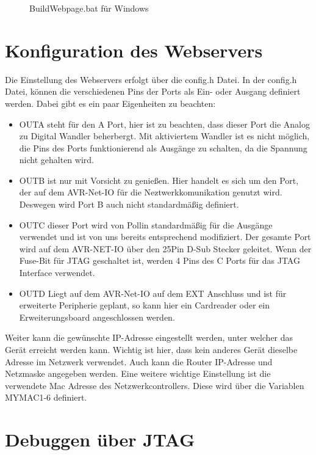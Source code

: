 \begin{figure}[H]

\caption{BuildWebpage.bat für Windows}
\label{output}
\end{figure}

\section{Konfiguration des Webservers}

Die Einstellung des Webservers erfolgt über die \textrm{config.h} Datei. In der
\textrm{config.h} Datei, können die verschiedenen Pins der Ports als Ein- oder
Ausgang definiert werden. Dabei gibt es ein paar Eigenheiten zu beachten:
\begin{itemize}
  \item OUTA steht für den A Port, hier ist zu beachten, dass dieser Port die
  Analog zu Digital Wandler beherbergt. Mit aktiviertem Wandler ist es nicht
  möglich, die Pins des Ports funktionierend als Ausgänge zu schalten, da die
  Spannung nicht gehalten wird.
  \item OUTB ist nur mit Vorsicht zu genießen. Hier handelt es sich um den Port,
  der auf dem AVR-Net-IO für die Neztwerkkomunikation genutzt wird. Deswegen
  wird Port B auch nicht standardmäßig definiert.
  \item OUTC dieser Port wird von Pollin standardmäßig für die Ausgänge verwendet
  und ist von uns bereits entsprechend modifiziert. Der gesamte Port wird auf dem
  AVR-NET-IO über den 25Pin D-Sub Stecker geleitet. Wenn der Fuse-Bit für
  \ac{JTAG} geschaltet ist, werden 4 Pins des C Ports für das \ac{JTAG} Interface
  verwendet.
  \item OUTD Liegt auf dem AVR-Net-IO auf dem EXT Anschluss und ist
  für erweiterte Peripherie geplant, so kann hier ein Cardreader oder ein
  Erweiterungsboard angeschlossen werden.
\end{itemize}
Weiter kann die gewünschte IP-Adresse eingestellt werden, unter welcher das
Gerät erreicht werden kann. Wichtig ist hier, dass kein anderes Gerät dieselbe Adresse
im Netzwerk verwendet. Auch kann die Router IP-Adresse und Netzmaske angegeben
werden. Eine weitere wichtige Einstellung ist die verwendete Mac Adresse
des Netzwerkcontrollers. Diese wird über die Variablen MYMAC1-6 definiert.

\section{Debuggen über JTAG}

